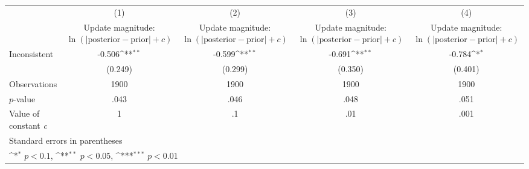 {
\def\sym#1{\ifmmode^{#1}\else\(^{#1}\)\fi}
\begin{tabular}{l*{4}{c}}
\hline\hline
                    &\multicolumn{1}{c}{(1)}         &\multicolumn{1}{c}{(2)}         &\multicolumn{1}{c}{(3)}         &\multicolumn{1}{c}{(4)}         \\
                    &\shortstack{Update magnitude: \\ $ \ln(|\text{posterior}-\text{prior}|+c) $}         &\shortstack{Update magnitude: \\ $ \ln(|\text{posterior}-\text{prior}|+c) $}         &\shortstack{Update magnitude: \\ $ \ln(|\text{posterior}-\text{prior}|+c) $}         &\shortstack{Update magnitude: \\ $ \ln(|\text{posterior}-\text{prior}|+c) $}         \\
\hline
Inconsistent        &      -0.506\sym{**} &      -0.599\sym{**} &      -0.691\sym{**} &      -0.784\sym{*}  \\
                    &     (0.249)         &     (0.299)         &     (0.350)         &     (0.401)         \\
\hline
Observations        &        1900         &        1900         &        1900         &        1900         \\
$p$-value           &        .043         &        .046         &        .048         &        .051         \\
Value of constant \textit{c}&           1         &          .1         &         .01         &        .001         \\
\hline\hline
\multicolumn{5}{l}{\footnotesize Standard errors in parentheses}\\
\multicolumn{5}{l}{\footnotesize \sym{*} \(p<0.1\), \sym{**} \(p<0.05\), \sym{***} \(p<0.01\)}\\
\end{tabular}
}
